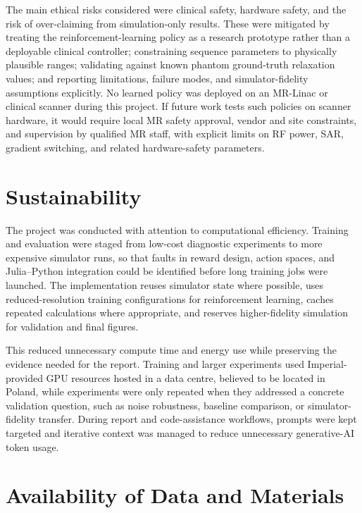 The main ethical risks considered were clinical safety, hardware safety, and the risk of over-claiming from simulation-only results. These were mitigated by treating the reinforcement-learning policy as a research prototype rather than a deployable clinical controller; constraining sequence parameters to physically plausible ranges; validating against known phantom ground-truth relaxation values; and reporting limitations, failure modes, and simulator-fidelity assumptions explicitly. No learned policy was deployed on an MR-Linac or clinical scanner during this project. If future work tests such policies on scanner hardware, it would require local MR safety approval, vendor and site constraints, and supervision by qualified MR staff, with explicit limits on RF power, SAR, gradient switching, and related hardware-safety parameters.

\section*{Sustainability}

The project was conducted with attention to computational efficiency. Training and evaluation were staged from low-cost diagnostic experiments to more expensive simulator runs, so that faults in reward design, action spaces, and Julia--Python integration could be identified before long training jobs were launched. The implementation reuses simulator state where possible, uses reduced-resolution training configurations for reinforcement learning, caches repeated calculations where appropriate, and reserves higher-fidelity simulation for validation and final figures.

This reduced unnecessary compute time and energy use while preserving the evidence needed for the report. Training and larger experiments used Imperial-provided GPU resources hosted in a data centre, believed to be located in Poland, while experiments were only repeated when they addressed a concrete validation question, such as noise robustness, baseline comparison, or simulator-fidelity transfer. During report and code-assistance workflows, prompts were kept targeted and iterative context was managed to reduce unnecessary generative-AI token usage.

\section*{Availability of Data and Materials}

